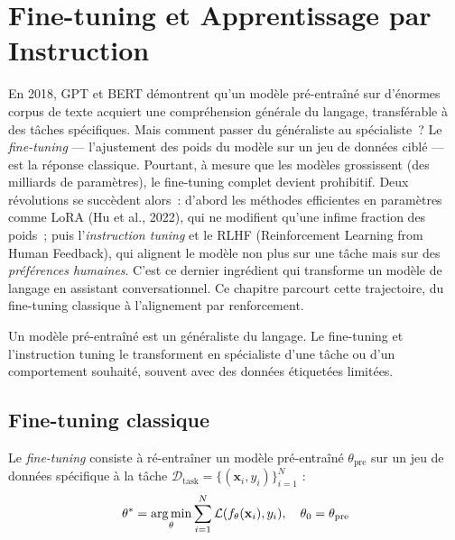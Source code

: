 \chapter{Fine-tuning et Apprentissage par Instruction}
\label{ch:finetuning}

En 2018, GPT et BERT d\'emontrent qu'un mod\`ele pr\'e-entra\^in\'e sur d'\'enormes corpus de texte acquiert une compr\'ehension g\'en\'erale du langage, transf\'erable \`a des t\^aches sp\'ecifiques. Mais comment passer du g\'en\'eraliste au sp\'ecialiste~? Le \emph{fine-tuning} --- l'ajustement des poids du mod\`ele sur un jeu de donn\'ees cibl\'e --- est la r\'eponse classique. Pourtant, \`a mesure que les mod\`eles grossissent (des milliards de param\`etres), le fine-tuning complet devient prohibitif. Deux r\'evolutions se succ\`edent alors~: d'abord les m\'ethodes \og efficientes en param\`etres \fg{} comme LoRA (Hu et al., 2022), qui ne modifient qu'une infime fraction des poids~; puis l'\emph{instruction tuning} et le RLHF (Reinforcement Learning from Human Feedback), qui alignent le mod\`ele non plus sur une t\^ache mais sur des \emph{pr\'ef\'erences humaines}. C'est ce dernier ingr\'edient qui transforme un mod\`ele de langage en assistant conversationnel. Ce chapitre parcourt cette trajectoire, du fine-tuning classique \`a l'alignement par renforcement.

\begin{intuition}[title=\textbf{Adapter un mod\`ele g\'en\'eraliste}]
Un mod\`ele pr\'e-entra\^in\'e est un \og g\'en\'eraliste \fg du langage.
Le fine-tuning et l'instruction tuning le transforment en sp\'ecialiste d'une
t\^ache ou d'un comportement souhait\'e, souvent avec des donn\'ees
\'etiquet\'ees limit\'ees.
\end{intuition}

\section{Fine-tuning classique}
\label{sec:ft:classique}

\begin{definition}
Le \emph{fine-tuning} consiste \`a r\'e-entra\^iner un mod\`ele pr\'e-entra\^in\'e
$\theta_{\text{pre}}$ sur un jeu de donn\'ees sp\'ecifique \`a la t\^ache
$\mathcal{D}_{\text{task}} = \{(\mathbf{x}_i, y_i)\}_{i=1}^{N}$ :
\[
\theta^* = \operatorname*{arg\,min}_\theta \sum_{i=1}^{N} \mathcal{L}(f_\theta(\mathbf{x}_i), y_i), \quad \theta_0 = \theta_{\text{pre}}
\]
\end{definition}

